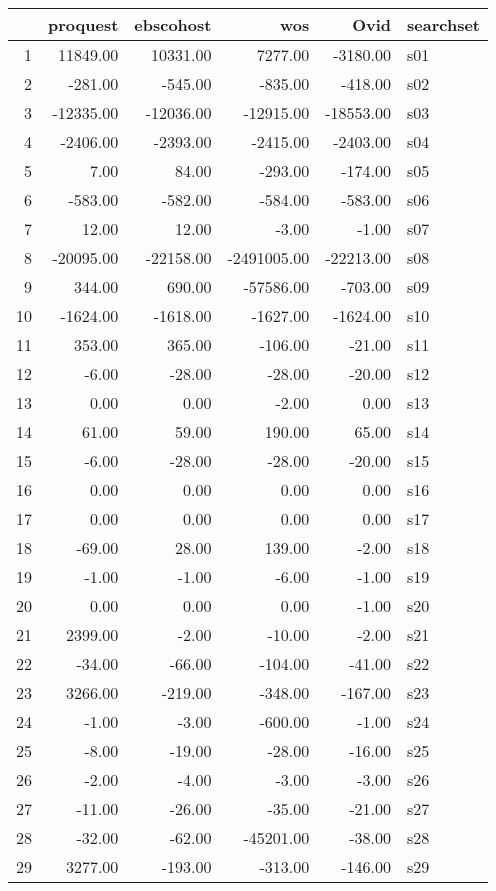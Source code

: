\begin{table}[ht]
\centering
\begin{tabular}{rrrrrl}
  \hline
 & proquest & ebscohost & wos & Ovid & searchset \\ 
  \hline
1 & 11849.00 & 10331.00 & 7277.00 & -3180.00 & s01 \\ 
  2 & -281.00 & -545.00 & -835.00 & -418.00 & s02 \\ 
  3 & -12335.00 & -12036.00 & -12915.00 & -18553.00 & s03 \\ 
  4 & -2406.00 & -2393.00 & -2415.00 & -2403.00 & s04 \\ 
  5 & 7.00 & 84.00 & -293.00 & -174.00 & s05 \\ 
  6 & -583.00 & -582.00 & -584.00 & -583.00 & s06 \\ 
  7 & 12.00 & 12.00 & -3.00 & -1.00 & s07 \\ 
  8 & -20095.00 & -22158.00 & -2491005.00 & -22213.00 & s08 \\ 
  9 & 344.00 & 690.00 & -57586.00 & -703.00 & s09 \\ 
  10 & -1624.00 & -1618.00 & -1627.00 & -1624.00 & s10 \\ 
  11 & 353.00 & 365.00 & -106.00 & -21.00 & s11 \\ 
  12 & -6.00 & -28.00 & -28.00 & -20.00 & s12 \\ 
  13 & 0.00 & 0.00 & -2.00 & 0.00 & s13 \\ 
  14 & 61.00 & 59.00 & 190.00 & 65.00 & s14 \\ 
  15 & -6.00 & -28.00 & -28.00 & -20.00 & s15 \\ 
  16 & 0.00 & 0.00 & 0.00 & 0.00 & s16 \\ 
  17 & 0.00 & 0.00 & 0.00 & 0.00 & s17 \\ 
  18 & -69.00 & 28.00 & 139.00 & -2.00 & s18 \\ 
  19 & -1.00 & -1.00 & -6.00 & -1.00 & s19 \\ 
  20 & 0.00 & 0.00 & 0.00 & -1.00 & s20 \\ 
  21 & 2399.00 & -2.00 & -10.00 & -2.00 & s21 \\ 
  22 & -34.00 & -66.00 & -104.00 & -41.00 & s22 \\ 
  23 & 3266.00 & -219.00 & -348.00 & -167.00 & s23 \\ 
  24 & -1.00 & -3.00 & -600.00 & -1.00 & s24 \\ 
  25 & -8.00 & -19.00 & -28.00 & -16.00 & s25 \\ 
  26 & -2.00 & -4.00 & -3.00 & -3.00 & s26 \\ 
  27 & -11.00 & -26.00 & -35.00 & -21.00 & s27 \\ 
  28 & -32.00 & -62.00 & -45201.00 & -38.00 & s28 \\ 
  29 & 3277.00 & -193.00 & -313.00 & -146.00 & s29 \\ 
   \hline
\end{tabular}
\end{table}
